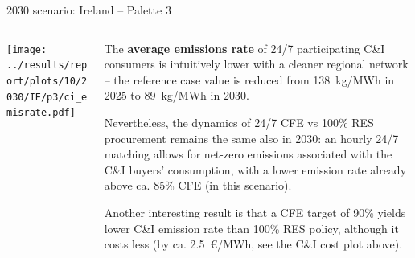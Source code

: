 \begin{frame}{2030 scenario: Ireland -- Palette 3}

{\footnotesize
\vspace{0.3cm}

\begin{columns}[T]
\begin{column}{9cm}
\centering

\texttt{[image: ../results/report/plots/10/2030/IE/p3/ci\_emisrate.pdf]}

\end{column}
\begin{column}{6cm}

\vspace{0.1cm}
The {\bf average emissions rate} of 24/7 participating C\&I consumers
is intuitively lower with a cleaner regional network -- 
the reference case value is reduced from 138~kg/MWh in 2025 to 
89~kg/MWh in 2030.

\vspace{0.3cm}
Nevertheless, the dynamics of 24/7 CFE vs 100\% RES 
procurement remains the same also in 2030: an hourly 24/7 matching 
allows for net-zero emissions associated with the C\&I buyers' consumption,
with a lower emission rate already above ca. 85\% CFE (in this scenario).

\vspace{0.3cm}
Another interesting result is that a CFE target of 90\% yields 
\alert{lower C\&I emission rate} than 100\% RES policy, although it 
\alert{costs less} (by ca. 2.5~\euro/MWh, see the C\&I cost plot above).

\end{column}
\end{columns}
}
\end{frame}


